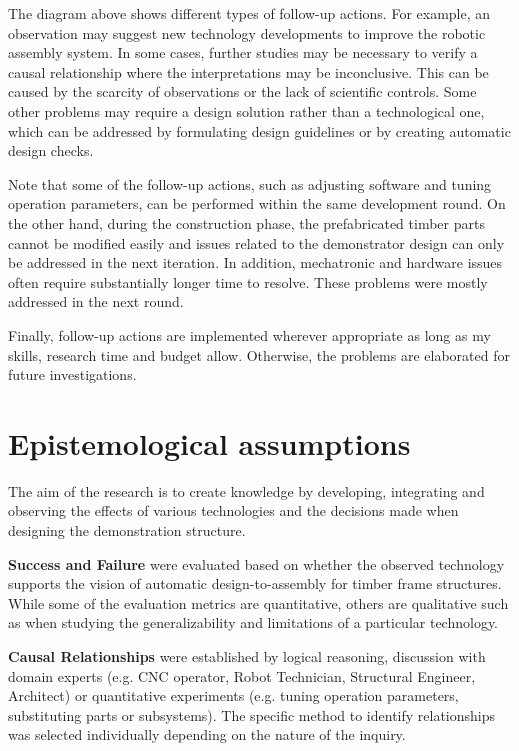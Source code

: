 \documentclass[11pt]{book}
\begin{document}
The diagram above shows different types of follow-up actions. For example, an observation may suggest new technology developments to improve the robotic assembly system. In some cases, further studies may be necessary to verify a causal relationship where the interpretations may be inconclusive. This can be caused by the scarcity of observations or the lack of scientific controls. Some other problems may require a design solution rather than a technological one, which can be addressed by formulating design guidelines or by creating automatic design checks. 

Note that some of the follow-up actions, such as adjusting software and tuning operation parameters, can be performed within the same development round. On the other hand, during the construction phase, the prefabricated timber parts cannot be modified easily and issues related to the demonstrator design can only be addressed in the next iteration. In addition, mechatronic and hardware issues often require substantially longer time to resolve. These problems were mostly addressed in the next round. 

Finally, follow-up actions are implemented wherever appropriate as long as my skills, research time and budget allow. Otherwise, the problems are elaborated for future investigations. 

\section{Epistemological assumptions}

The aim of the research is to create knowledge by developing, integrating and observing the effects of various technologies and the decisions made when designing the demonstration structure.

\textbf{Success and Failure} were evaluated based on whether the observed technology supports the vision of automatic design-to-assembly for timber frame structures. While some of the evaluation metrics are quantitative, others are qualitative such as when studying the generalizability and limitations of a particular technology.

\textbf{Causal Relationships} were established by logical reasoning, discussion with domain experts (e.g. CNC operator, Robot Technician, Structural Engineer, Architect) or quantitative experiments (e.g. tuning operation parameters, substituting parts or subsystems). The specific method to identify relationships was selected individually depending on the nature of the inquiry.
\end{document}
